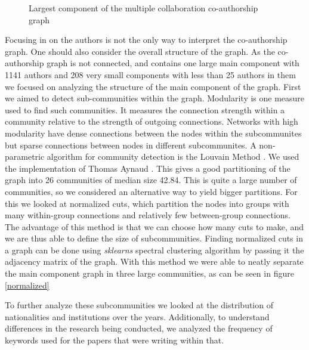 \documentclass[article,twocolumn]{IEEEtran}
\begin{document}
    \begin{figure}
        \begin{center}\end{center}
        \caption{Largest component of the multiple collaboration co-authorship graph}
        \label{author_collab_large}
    \end{figure}
    

    
    
    Focusing in on the authors is not the only way to interpret the
co-authorship graph. One should also consider the overall structure of
the graph. As the co-authorship graph is not connected, and contains one
large main component with 1141 authors and 208 very small components
with less than 25 authors in them we focused on analyzing the structure
of the main component of the graph. First we aimed to detect
sub-communities within the graph. Modularity is one measure used to find
such communities. It measures the connection strength within a community
relative to the strength of outgoing connections. Networks with high
modularity have dense connections between the nodes within the
subcommunites but sparse connections between nodes in different
subcommunites. A non-parametric algorithm for community detection is the
Louvain Method \cite{blondel2008fast}. We used the implementation of
Thomas Aynaud \cite{louvain}. This gives a good partitioning of the
graph into 26 communities of median size 42.84. This is quite a large
number of communities, so we considered an alternative way to yield
bigger partitions. For this we looked at normalized cuts, which
partition the nodes into groups with many within-group connections and
relatively few between-group connections. The advantage of this method
is that we can choose how many cuts to make, and we are thus able to
define the size of subcommunities. Finding normalized cuts in a graph
can be done using \emph{sklearns} spectral clustering algorithm by
passing it the adjacency matrix of the graph. With this method we were
able to neatly separate the main component graph in three large
communities, as can be seen in figure \ref{normalized}

    To further analyze these subcommunities we looked at the distribution of
nationalities and institutions over the years. Additionally, to
understand differences in the research being conducted, we analyzed the
frequency of keywords used for the papers that were writing within that.
\end{document}
